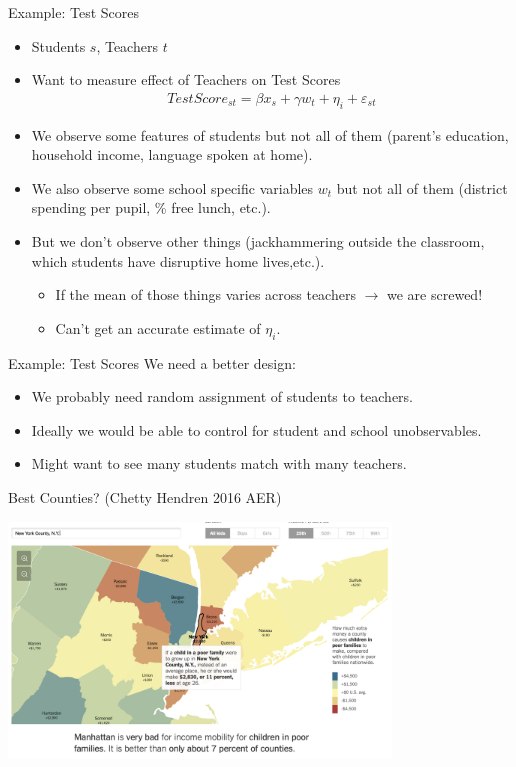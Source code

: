 \documentclass[xcolor=pdftex,dvipsnames,table,mathserif,aspectratio=169]{beamer}
\begin{document}
\begin{frame}{Example: Test Scores}
\begin{itemize}
\item Students $s$, Teachers $t$
\item Want to measure effect of \alert{Teachers} on \alert{Test Scores}
\begin{eqnarray*}
TestScore_{st} = \beta x_s +\gamma w_t+  \eta_{i} + \varepsilon_{st}
\end{eqnarray*}
\item We observe some features of students but not all of them (parent's education, household income, language spoken at home).
\item We also observe some school specific variables $w_t$ but not all of them (district spending per pupil, \% free lunch, etc.).
\item But we don't observe other things (jackhammering outside the classroom, which students have disruptive home lives,etc.).
\begin{itemize}
\item If the mean of those things varies across teachers $\rightarrow$ we are screwed!
\item Can't get an accurate estimate of $\eta_i$.
\end{itemize}
\end{itemize}
\end{frame}


\begin{frame}{Example: Test Scores}
We need a better design:
\begin{itemize}
\item We probably need random assignment of students to teachers.
\item Ideally we would be able to control for student and school unobservables.
\item Might want to see many students match with many teachers.
\end{itemize}
\end{frame}



\begin{frame}{Best Counties? (Chetty Hendren 2016 AER)}
\begin{center}
\includegraphics[width=4in]{./resources/chetty2.png}
\end{center}
\end{frame}
\end{document}
